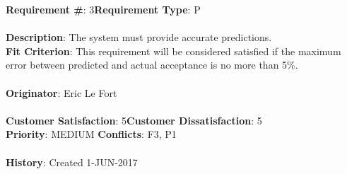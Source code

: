 \documentclass[titlepage]{article}
\begin{document}
\begin{framed}
	\noindent\textbf{Requirement \#}: 3\hfill \textbf{Requirement Type}: P\hfill\\\\
	\noindent\textbf{Description}: The system must provide accurate predictions.\\
	\textbf{Fit Criterion}: This requirement will be considered satisfied if the maximum error between predicted and actual acceptance is no more than 5\%.\\\\
	\textbf{Originator}: Eric Le Fort\\\\
	\noindent\textbf{Customer Satisfaction}: 5\hfill \textbf{Customer Dissatisfaction}: 5\hfill\\
	\textbf{Priority}: MEDIUM \hfill \textbf{Conflicts}: F3, P1\hfill\\\\
	\noindent\textbf{History}: Created 1-JUN-2017
\end{framed}
\end{document}

